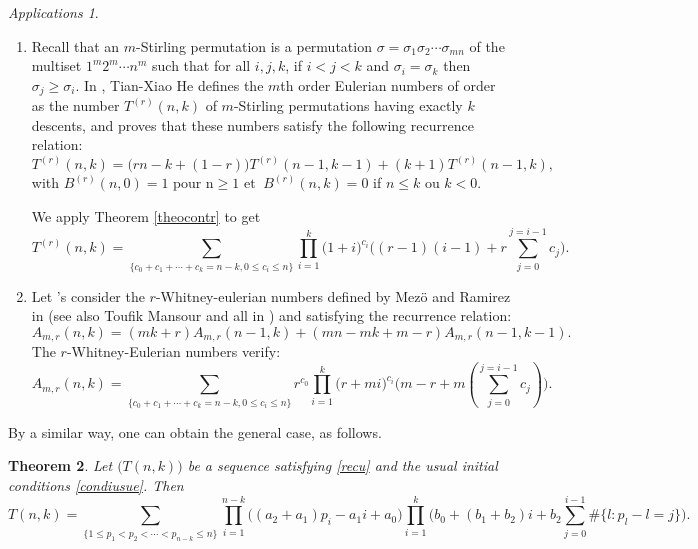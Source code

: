\documentclass[12pt,a4paper]{article}
\newtheorem{theorem}{Theorem}[section]
\theoremstyle{definition} %
\theoremstyle{remark}
\theoremstyle{examples}
\newtheorem{appli}[theorem]{Applications}
\newcommand{\suit}[1]{{#1}(n,k)}
\newcommand{\coss}{\cdots}
\begin{document}
\begin{appli}\rm\begin{enumerate}
		\item Recall that an $m$-Stirling permutation is a permutation $\sigma= \sigma_1\sigma_2\cdots\sigma_{mn}$ of the multiset $1^m2^m\cdots n^m$ such that for all $i,j, k$, if $i<j<k$ and $\sigma_i=\sigma_k$ then $\sigma_j\geq \sigma_i$. In \cite{He2023mthOrderEulerian}, 	
		Tian-Xiao He defines the $m$th order Eulerian numbers of order 
		as the number $T^{(r)}(n,k)$  of $m$-Stirling permutations having exactly $k$ descents, and proves that these numbers satisfy the following recurrence relation:
		\begin{equation}
		T^{(r)}(n,k)=\big(rn-k+(1-r)\big)T^{(r)}(n-1,k-1) + (k+1)T^{(r)}(n-1,k),
		\label{2.4}
		\end{equation}
		with $B^{(r)}(n,0)=1\mbox{ pour } $n$\geq 1\text{  et }~ B^{(r)}(n,k)=0$ if $n\leq k$ ou $k<0$.
		
		
		We apply Theorem \ref{theocontr} to get
		\begin{equation} 
		\suit{T^{(r)}} = \sum_{\{c_0+c_1+\coss+c_{k}=n-k, 0\leq c_i\leq n\}}  \prod_{i=1}^{k} \big(1+i)^{c_{i}} \Big( (r-1)(i-1)+r \sum_{j=0}^{j=i-1}c_j \Big).
		\end{equation}
		\item Let 's consider the $r$-Whitney-eulerian numbers defined by Mez\"o and Ramirez in \cite{Mezoram} (see also Toufik Mansour and all in \cite{manramshavil}) and satisfying the recurrence relation:
		\begin{equation}
		A_{m,r} (n, k) = (mk+r)A_{m,r}(n-1, k)+ (mn-mk+m-r) A_{m,r}(n-1, k-1).
		\end{equation}
		The $r$-Whitney-Eulerian numbers verify:
		\begin{equation}
		A_{m,r} (n, k) =\sum_{\{c_0+c_1+\coss+c_{k}=n-k, 0\leq c_i\leq n\}}  r^{c_0}\prod_{i=1}^{k} \big(r+mi)^{c_{i}} \Big(m-r+ m (\sum_{j=0}^{j=i-1}c_j) \Big).
		\end{equation}
	\end{enumerate} 
\end{appli}
\noindent 
By a similar way, one can obtain the general case, as follows.
\begin{theorem}\label{theocontr2}
	Let $\big(\suit{T}\big)$ be a sequence satisfying \eqref{recu} and the usual initial conditions \eqref{condiusue}. 
	Then
	\begin{equation}
		\suit{T}
		= \sum_{\{1\leq p_1<p_2<\cdots <p_{n-k}\leq n\}}
		\prod_{i=1}^{n-k} \Big( (a_2+a_1)p_i-a_1 i+a_0 \Big)
		\prod_{i=1}^{k} \Big(b_0+ (b_1+b_2)i+b_2 \sum_{j=0}^{i-1}\# \{l: p_l-l=j\} \Big).
	\end{equation}
\end{theorem}
\end{document}
